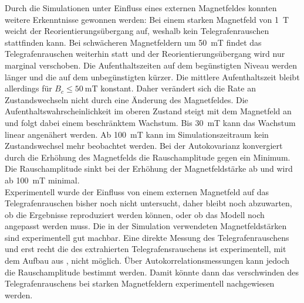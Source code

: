 \documentclass[main.tex]{subfiles}
\begin{document}
Durch die Simulationen unter Einfluss eines externen Magnetfeldes konnten weitere Erkenntnisse gewonnen werden:
Bei einem starken Magnetfeld von \SI{1}{\tesla} weicht der Reorientierungsübergang auf, weshalb kein Telegrafenrauschen stattfinden kann. Bei schwächeren Magnetfeldern um \SI{50}{\milli\tesla} findet das Telegrafenrauschen weiterhin statt und der Reorientierungsübergang wird nur marginal verschoben. Die Aufenthaltszeiten auf dem begünstigten Niveau werden länger und die auf dem unbegünstigten kürzer. Die mittlere Aufenthaltszeit bleibt allerdings für \(B_c \leq \SI{50}{\milli\tesla}\) konstant. Daher verändert sich die Rate an Zustandswechseln nicht durch eine Änderung des Magnetfeldes.
Die Aufenthaltswahrscheinlichkeit im oberen Zustand steigt mit dem Magnetfeld an und folgt dabei einem beschränktem Wachstum. Bis \SI{30}{\milli\tesla} kann das Wachstum linear angenähert werden.
Ab \SI{100}{\milli\tesla} kann im Simulationszeitraum kein Zustandswechsel mehr beobachtet werden. Bei der Autokovarianz konvergiert durch die Erhöhung des Magnetfelds die Rauschamplitude gegen ein Minimum. 
Die Rauschamplitude sinkt bei der Erhöhung der Magnetfeldstärke ab und wird ab \SI{100}{\milli\tesla} minimal.\\



Experimentell wurde der Einfluss von einem externen Magnetfeld auf das Telegrafenrauschen bisher noch nicht untersucht, daher bleibt noch abzuwarten, ob die Ergebnisse reproduziert werden können, oder ob das Modell noch angepasst werden muss.
Die in der Simulation verwendeten Magnetfeldstärken sind experimentell gut machbar. Eine direkte Messung des Telegrafenrauschens und erst recht die des extrahierten Telegrafensrauschens ist experimentell, mit dem Aufbau aus \cite{weiss-ultrafast}, nicht möglich. Über Autokorrelationsmessungen kann jedoch die Rauschamplitude bestimmt werden. Damit könnte dann das verschwinden des Telegrafenrauschens bei starken Magnetfeldern experimentell nachgewiesen werden.\\
\end{document}
